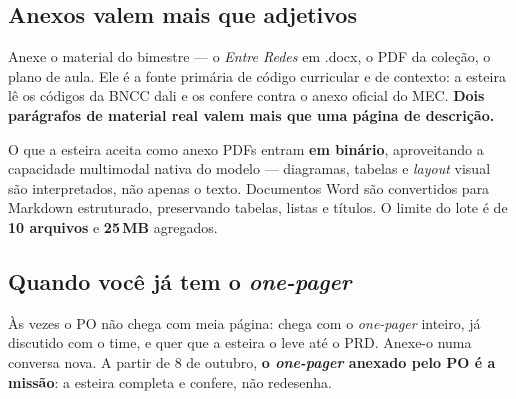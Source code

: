 \documentclass[11pt,a4paper]{article}
\newcommand{\cod}[1]{{\ttfamily\small #1}}
\begin{document}
\subsection{Anexos valem mais que adjetivos}

Anexe o material do bimestre --- o \emph{Entre Redes} em \cod{.docx}, o PDF da coleção, o plano de aula. Ele é a fonte primária de código curricular e de contexto: a esteira lê os códigos da BNCC dali e os confere contra o anexo oficial do MEC. \textbf{Dois parágrafos de material real valem mais que uma página de descrição.}

\begin{caixaNorma}{O que a esteira aceita como anexo}
PDFs entram \textbf{em binário}, aproveitando a capacidade multimodal nativa do modelo --- diagramas, tabelas e \emph{layout} visual são interpretados, não apenas o texto. Documentos Word são convertidos para Markdown estruturado, preservando tabelas, listas e títulos. O limite do lote é de \textbf{10 arquivos} e \textbf{25\,MB} agregados.
\end{caixaNorma}

\subsection{Quando você já tem o \emph{one-pager}}
\label{sec:onepagerpo}

Às vezes o PO não chega com meia página: chega com o \emph{one-pager} inteiro, já discutido com o time, e quer que a esteira o leve até o PRD. Anexe-o numa conversa nova. A partir de 8 de outubro, \textbf{o \emph{one-pager} anexado pelo PO é a missão}: a esteira completa e confere, não redesenha.
\end{document}
